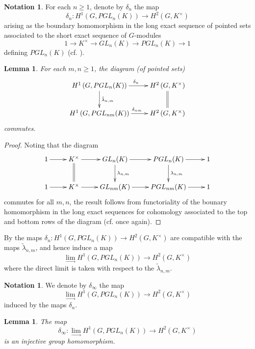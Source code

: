 \documentclass[11pt]{amsart}
\numberwithin{equation}{section}
\newtheorem{lemma}[equation]{Lemma}
\theoremstyle{remark}
\theoremstyle{remark}
\theoremstyle{remark}
\theoremstyle{definition}
\theoremstyle{definition}
\theoremstyle{definition}
\theoremstyle{definition}
\newtheorem{notation}[equation]{Notation}
\theoremstyle{definition}
\theoremstyle{definition}
\begin{document}
\begin{notation}
For each $n\geq 1$, denote by $\delta_n$ the map
\[\delta_n:H^1\left(G,PGL_n(K)\right)\longrightarrow H^2\left(G,K^{\times}\right)\]
arising as the boundary homomorphism in the long exact sequence of pointed sets associated to the short exact sequence of $G$-modules
\[1\longrightarrow K^{\times} \longrightarrow GL_n(K)\longrightarrow PGL_n(K)\longrightarrow 1\]
defining $PGL_n(K)$  (cf. ).
\end{notation}

\begin{lemma} \label{compatibility of maps into brauer}
For each $m,n\geq 1$, the diagram (of pointed sets)
\[\xymatrix{H^1\left(G,PGL_n(K)\right)\ar[d]^{\tilde{\lambda}_{n,m}}\ar[r]^{\phantom{hi}\delta_n}&H^2\left(G,K^{\times}\right)\ar@{=}[d]\\ 
H^1\left(G,PGL_{nm}(K)\right)\ar[r]^{\phantom{hii}\delta_{nm}}&H^2\left(G,K^{\times}\right)}\]
commutes.
\end{lemma}

\begin{proof}
Noting that the diagram 
\[\xymatrix{1\ar[r]&K^{\times}\ar@{=}[d]\ar[r]& GL_n(K)\ar[d]^{\lambda_{n,m}}\ar[r]&PGL_n(K)\ar[d]^{\lambda_{n,m}}\ar[r]&1\\1\ar[r]&K^{\times}\ar[r]& GL_{nm}(K)\ar[r]&PGL_{nm}(K)\ar[r]&1}\]
commutes for all $m,n$, the result follows from functoriality of the bounary homomorphism in the long exact sequences for cohomology associated to the top and bottom rows of the diagram (cf.  once again).   
\end{proof}

By  the maps $\delta_n:H^1\left(G,PGL_n(K)\right)\rightarrow H^2\left(G,K^{\times}\right)$ are compatible with the maps $\tilde{\lambda}_{n,m}$, and hence induce a map 
\[\lim_{\rightarrow}H^1\left(G,PGL_n(K)\right)\rightarrow H^2\left(G,K^{\times}\right)\]
where the direct limit is taken with respect to the $\tilde{\lambda}_{n,m}$.

\begin{notation}
We denote by $\delta_\infty$ the map 
\[\lim_{\rightarrow}H^1\left(G,PGL_n(K)\right)\rightarrow H^2\left(G,K^{\times}\right)\]
induced by the maps $\delta_n$.
\end{notation}
 
\begin{lemma} \label{injectivity of brauer map}
The map \[\delta_\infty:\lim_{\rightarrow}H^1\left(G,PGL_n(K)\right)\rightarrow H^2\left(G,K^{\times}\right)\]
is an injective group homomorphism. 
\end{lemma}
\end{document}
